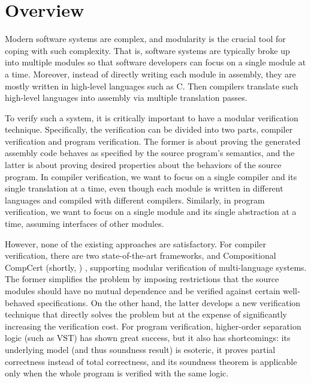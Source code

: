 \chapter{\;\;\;\;Overview}\label{sec:overview}


Modern software systems are complex, and modularity is the crucial tool for coping with such complexity.
That is, software systems are typically broke up into multiple modules so that software developers can focus on a single module at a time.
Moreover, instead of directly writing each module in assembly, they are mostly written in high-level languages such as C.
Then compilers translate such high-level languages into assembly via multiple translation passes.




To verify such a system, it is critically important to have a modular verification technique.
Specifically, the verification can be divided into two parts, compiler verification and program verification.
The former is about proving the generated assembly code behaves as specified by the source program's semantics,
and the latter is about proving desired properties about the behaviors of the source program.
In compiler verification, we want to focus on a single compiler and its single translation at a time, even though each module is written in different languages and compiled with different compilers.
Similarly, in program verification, we want to focus on a single module and its single abstraction at a time, assuming interfaces of other modules.




However, none of the existing approaches are satisfactory.
For compiler verification, there are two state-of-the-art frameworks, \ccx{} \cite{gu:dscal,wang:saccx} and Compositional CompCert (shortly, \ccc{}) \cite{beringer:isem,stewart:ccc},
supporting modular verification of multi-language systems. %
The former simplifies the problem by
imposing restrictions that the source modules should have no mutual
dependence and be verified against certain well-behaved
specifications. On the other hand, the latter develops a new
verification technique that directly solves the problem but at the
expense of significantly increasing the verification cost.
For program verification, higher-order separation logic (such as VST\cite{VST}) has shown great success, but it also has shortcomings:
its underlying model (and thus soundness result) is esoteric, it proves partial correctness instead of total correctness,
and its soundness theorem is applicable only when the whole program is verified with the same logic.








